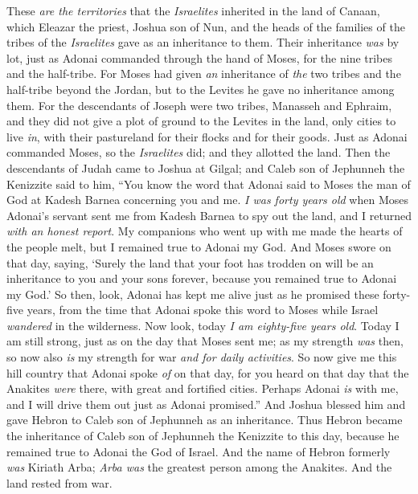 \begin{biblechapter} %
 These \textit{are the territories} that the \textit{Israelites} inherited in the land of Canaan, which Eleazar the priest, Joshua son of Nun, and the heads of the families of the tribes of the \textit{Israelites} gave as an inheritance to them.
\verse Their inheritance \textit{was} by lot, just as Adonai commanded through the hand of Moses, for the nine tribes and the half-tribe.
\verse For Moses had given \textit{an} inheritance of \textit{the} two tribes and the half-tribe beyond the Jordan, but to the Levites he gave no inheritance among them.
\verse For the descendants of Joseph were two tribes, Manasseh and Ephraim, and they did not give a plot of ground to the Levites in the land, only cities to live \textit{in}, with their pastureland for their flocks and for their goods.
\verse Just as Adonai commanded Moses, so the \textit{Israelites} did; and they allotted the land.
 Then the descendants of Judah came to Joshua at Gilgal; and Caleb son of Jephunneh the Kenizzite said to him, “You know the word that Adonai said to Moses the man of God at Kadesh Barnea concerning you and me.
\verse \textit{I was forty years old} when Moses Adonai’s servant sent me from Kadesh Barnea to spy out the land, and I returned \textit{with an honest report}.
\verse My companions who went up with me made the hearts of the people melt, but I remained true to Adonai my God.
\verse And Moses swore on that day, saying, ‘Surely the land that your foot has trodden on will be an inheritance to you and your sons forever, because you remained true to Adonai my God.’
\verse So then, look, Adonai has kept me alive just as he promised these forty-five years, from the time that Adonai spoke this word to Moses while Israel \textit{wandered} in the wilderness. Now look, today \textit{I am eighty-five years old}.
\verse Today I am still strong, just as on the day that Moses sent me; as my strength \textit{was} then, so now also \textit{is} my strength for war \textit{and for daily activities}.
\verse So now give me this hill country that Adonai spoke \textit{of} on that day, for you heard on that day that the Anakites \textit{were} there, with great and fortified cities. Perhaps Adonai \textit{is} with me, and I will drive them out just as Adonai promised.”
\verse And Joshua blessed him and gave Hebron to Caleb son of Jephunneh as an inheritance.
\verse Thus Hebron became the inheritance of Caleb son of Jephunneh the Kenizzite to this day, because he remained true to Adonai the God of Israel.
\verse And the name of Hebron formerly \textit{was} Kiriath Arba; \textit{Arba was} the greatest person among the Anakites. And the land rested from war.
\end{biblechapter}

